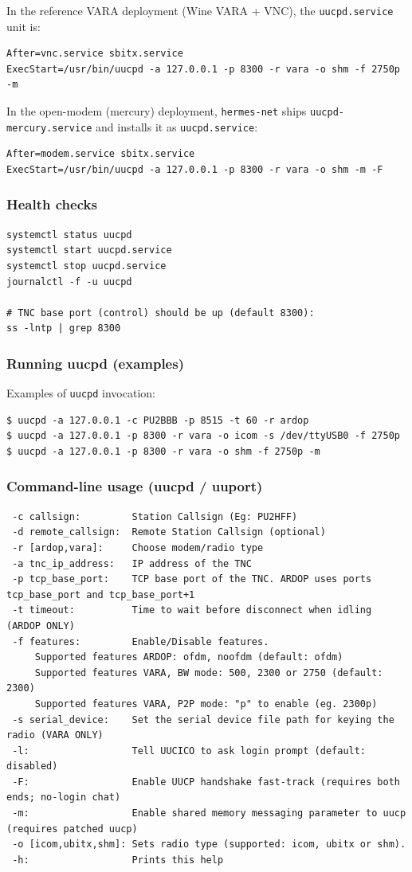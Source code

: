 In the reference VARA deployment (Wine VARA + VNC), the \verb|uucpd.service| unit is:
\begin{verbatim}
After=vnc.service sbitx.service
ExecStart=/usr/bin/uucpd -a 127.0.0.1 -p 8300 -r vara -o shm -f 2750p -m
\end{verbatim}

In the open-modem (mercury) deployment, \verb|hermes-net| ships \verb|uucpd-mercury.service| and installs it as \verb|uucpd.service|:
\begin{verbatim}
After=modem.service sbitx.service
ExecStart=/usr/bin/uucpd -a 127.0.0.1 -p 8300 -r vara -o shm -m -F
\end{verbatim}

\subsubsection{Health checks}
\begin{verbatim}
systemctl status uucpd
systemctl start uucpd.service
systemctl stop uucpd.service
journalctl -f -u uucpd

# TNC base port (control) should be up (default 8300):
ss -lntp | grep 8300
\end{verbatim}

\subsubsection{Running uucpd (examples)}

Examples of \verb|uucpd| invocation:

\begin{verbatim}
$ uucpd -a 127.0.0.1 -c PU2BBB -p 8515 -t 60 -r ardop
$ uucpd -a 127.0.0.1 -p 8300 -r vara -o icom -s /dev/ttyUSB0 -f 2750p
$ uucpd -a 127.0.0.1 -p 8300 -r vara -o shm -f 2750p -m
\end{verbatim}

\subsubsection{Command-line usage (uucpd / uuport)}
\begin{verbatim}
 -c callsign:         Station Callsign (Eg: PU2HFF)
 -d remote_callsign:  Remote Station Callsign (optional)
 -r [ardop,vara]:     Choose modem/radio type
 -a tnc_ip_address:   IP address of the TNC
 -p tcp_base_port:    TCP base port of the TNC. ARDOP uses ports tcp_base_port and tcp_base_port+1
 -t timeout:          Time to wait before disconnect when idling (ARDOP ONLY)
 -f features:         Enable/Disable features.
     Supported features ARDOP: ofdm, noofdm (default: ofdm)
     Supported features VARA, BW mode: 500, 2300 or 2750 (default: 2300)
     Supported features VARA, P2P mode: "p" to enable (eg. 2300p)
 -s serial_device:    Set the serial device file path for keying the radio (VARA ONLY)
 -l:                  Tell UUCICO to ask login prompt (default: disabled)
 -F:                  Enable UUCP handshake fast-track (requires both ends; no-login chat)
 -m:                  Enable shared memory messaging parameter to uucp (requires patched uucp)
 -o [icom,ubitx,shm]: Sets radio type (supported: icom, ubitx or shm).
 -h:                  Prints this help
\end{verbatim}

